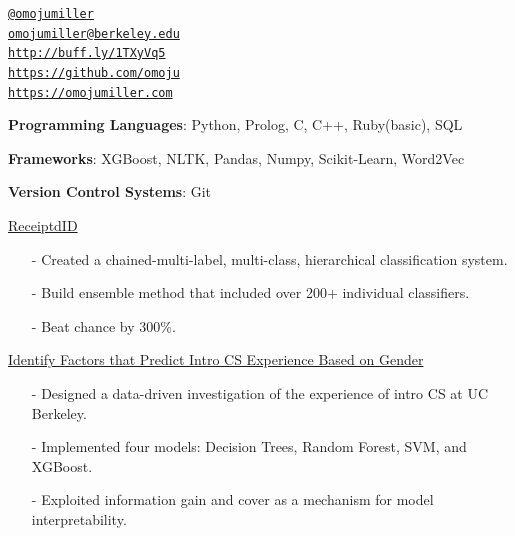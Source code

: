 \documentclass[11pt,article,oneside]{memoir}
\makeatletter
\def\myemail{omojumiller@berkeley.edu}
\def\myweb{https://omojumiller.com}
\def\mytwitter{@omojumiller}
\def\mylinkedin{http://buff.ly/1TXyVq5}
\def\mygithub{https://github.com/omoju}
\makeatother
\begin{document}
\begin{minipage}[t]{2.95in}

\end{minipage}
\hfill
\hfill
\begin{minipage}[t]{2in}
  \flushright \footnotesize  \addressblock
  {\scriptsize  \texttt{\href{http://twitter.com/omojumiller}{\mytwitter}} \, \faTwitter }  \\
  {\scriptsize  \texttt{\href{mailto:\myemail}{\myemail}} \, \faEnvelope} \\
  {\scriptsize  \texttt{\href{\mylinkedin}{\mylinkedin}} \, \faLinkedin} \\
  {\scriptsize  \texttt{\href{\mygithub}{\mygithub}} \, \faGithub} \\
  {\scriptsize  \texttt{\href{\myweb}{\myweb}} \, \faGlobe}
\end{minipage}

\medskip

\reversemarginpar

\bigskip

\medskip

\ind \textbf{Programming Languages}: Python, Prolog, C, C++, Ruby(basic), SQL

\ind \textbf{Frameworks}: XGBoost, NLTK, Pandas, Numpy, Scikit-Learn, Word2Vec

\ind \textbf{Version Control Systems}: Git


\medskip

\ind \href{https://github.com/omoju/receiptdID}{ReceiptdID}
\begin{itemize}[noitemsep,nolistsep]
\item[-] Created a chained-multi-label, multi-class, hierarchical classification system.
\item[-] Build ensemble method that included over 200+ individual classifiers.
\item[-] Beat chance by 300\%.
\end{itemize}

\ind \href{https://github.com/omoju/IntroCSExperiencePrediction}{Identify Factors that Predict Intro CS Experience Based on Gender}
\begin{itemize}[noitemsep,nolistsep]
\item[-] Designed a data-driven investigation of the experience of intro CS at UC Berkeley.
\item[-] Implemented four models: Decision Trees, Random Forest, SVM, and XGBoost.
\item[-] Exploited information gain and cover as a mechanism for model interpretability.
\end{itemize}
\end{document}
